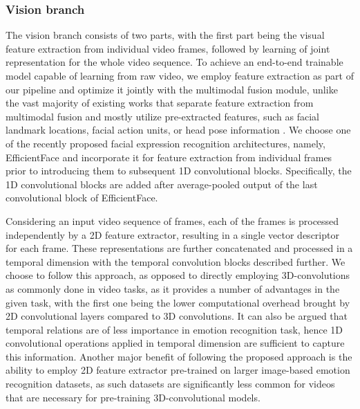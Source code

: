 \documentclass[a4paper,conference]{IEEEtran}
\begin{document}
\subsubsection{Vision branch}

The vision branch consists of two parts, with the first part being the visual feature extraction from individual video frames, followed by learning of joint representation for the whole video sequence. To achieve an end-to-end trainable model capable of learning from raw video, we employ feature extraction as part of our pipeline and optimize it jointly with the multimodal fusion module, unlike the vast majority of existing works that separate feature extraction from multimodal fusion and mostly utilize pre-extracted features, such as facial landmark locations, facial action units, or head pose information \cite{mult, icasspav}. We choose one of the recently proposed facial expression recognition architectures, namely, EfficientFace \cite{efficientface} and incorporate it for feature extraction from individual frames prior to introducing them to subsequent 1D convolutional blocks. Specifically, the 1D convolutional blocks are added after average-pooled output of the last convolutional block of EfficientFace.

Considering an input video sequence of  frames, each of the  frames is processed independently by a 2D feature extractor, resulting in a single vector descriptor for each frame. These representations are further concatenated and processed in a temporal dimension with the temporal convolution blocks described further. We choose to follow this approach, as opposed to directly employing 3D-convolutions as commonly done in video tasks, as it provides a number of advantages in the given task, with the first one being the lower computational overhead brought by 2D convolutional layers compared to 3D convolutions. It can also be argued that temporal relations are of less importance in emotion recognition task, hence 1D convolutional operations applied in temporal dimension are sufficient to capture this information. Another major benefit of following the proposed approach is the ability to employ 2D feature extractor pre-trained on larger image-based emotion recognition datasets, as such datasets are significantly less common for videos that are necessary for pre-training 3D-convolutional models. 
\end{document}
